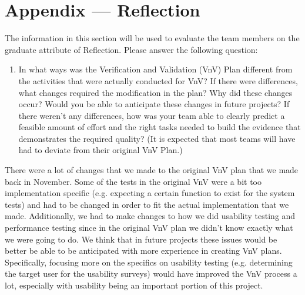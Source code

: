 \documentclass[12pt, titlepage]{article}
\begin{document}

\newpage{}
\section*{Appendix --- Reflection}

The information in this section will be used to evaluate the team members on the
graduate attribute of Reflection.  Please answer the following question:

\begin{enumerate}
  \item In what ways was the Verification and Validation (VnV) Plan different
  from the activities that were actually conducted for VnV?  If there were
  differences, what changes required the modification in the plan?  Why did
  these changes occur?  Would you be able to anticipate these changes in future
  projects?  If there weren't any differences, how was your team able to clearly
  predict a feasible amount of effort and the right tasks needed to build the
  evidence that demonstrates the required quality?  (It is expected that most
  teams will have had to deviate from their original VnV Plan.)
\end{enumerate}

There were a lot of changes that we made to the original VnV plan that we made back in November. Some of the tests in the original VnV were a bit too implementation specific (e.g. expecting a certain function to exist for the system tests) and had to be changed in order to fit the actual implementation that we made. Additionally, we had to make changes to how we did usability testing and performance testing since in the original VnV plan we didn't know exactly what we were going to do. We think that in future projects these issues would be better be able to be anticipated with more experience in creating VnV plans. Specifically, focusing more on the specifics on usability testing (e.g. determining the target user for the usability surveys) would have improved the VnV process a lot, especially with usability being an important portion of this project. 
\end{document}
